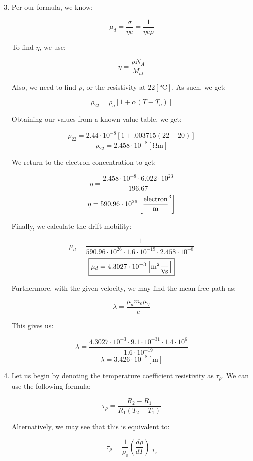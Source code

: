 \begin{enumerate}

    \setcounter{enumi}{2}

  \item Per our formula, we know:

    $$\mu_d=\frac{\sigma}{\eta e}=\frac{1}{\eta e\rho}$$

    To find $\eta$, we use:

    $$\eta=\frac{\rho N_A}{M_{at}}$$

    Also, we need to find $\rho$, or the resistivity at $22\left[ \si{\celsius} \right]$. As such, we get:

    $$\rho_{22}=\rho_o[1+\alpha(T-T_o)]$$

    Obtaining our values from a known value table, we get:

    $$\rho_{22}=2.44\cdot10^{-8}[1+.003715(22-20)]$$
    $$\rho_{22}=2.458\cdot10^{-8}\left[ \si{\ohm\meter} \right]$$

    We return to the electron concentration to get:

    $$\eta=\frac{2.458\cdot10^{-8}\cdot 6.022\cdot10^{23}}{196.67}$$
    $$\eta=590.96\cdot10^{26}\left[ \si{electron\over\meter\cubed} \right]$$

    Finally, we calculate the drift mobility:

    $$\mu_d=\frac{1}{590.96\cdot10^{26}\cdot1.6\cdot10^{-19}\cdot 2.458\cdot10^{-8}}$$
    $$\boxed{\mu_d=4.3027\cdot10^{-3}\left[ \si{\meter\squared\over\volt\second} \right]}$$

    Furthermore, with the given velocity, we may find the mean free path as:

    $$\lambda=\frac{\mu_d m_e\mu_V}{e}$$

    This gives us:

    $$\lambda=\frac{4.3027\cdot10^{-3}\cdot9.1\cdot10^{-31}\cdot1.4\cdot10^{6}}{1.6\cdot10^{-19}}$$
    $$\boxed{\lambda=3.426\cdot10^{-8}[\si{\meter}]}$$

    \setcounter{enumi}{4}

  \item Let us begin by denoting the temperature coefficient resistivity as $\tau_{\rho}$. We can use the following formula:

    $$\tau_{\rho}=\frac{R_2-R_1}{R_1(T_2-T_1)}$$

    Alternatively, we may see that this is equivalent to:

    $$\tau_{\rho}=\frac{1}{\rho_o}\left( \frac{d\rho}{dT} \right)\Big|_{T_o}$$


\end{enumerate}
